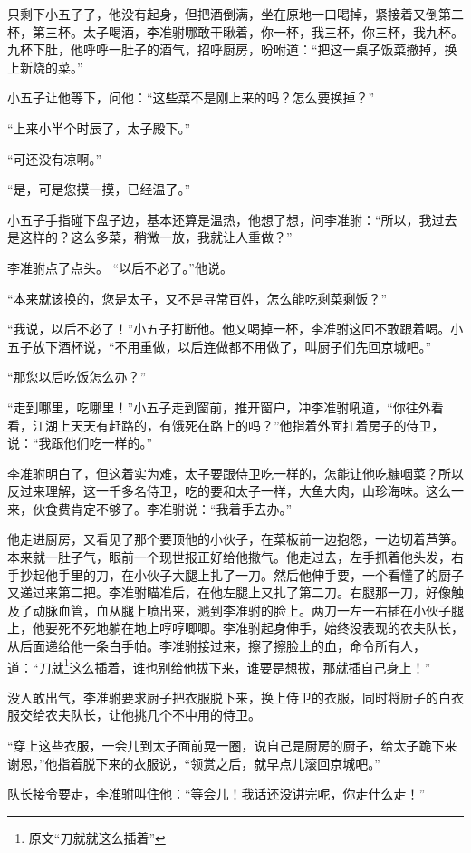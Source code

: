 只剩下小五子了，他没有起身，但把酒倒满，坐在原地一口喝掉，紧接着又倒第二杯，第三杯。太子喝酒，李准驸哪敢干瞅着，你一杯，我三杯，你三杯，我九杯。九杯下肚，他呼呼一肚子的酒气，招呼厨房，吩咐道：“把这一桌子饭菜撤掉，换上新烧的菜。”

小五子让他等下，问他：“这些菜不是刚上来的吗？怎么要换掉？”

“上来小半个时辰了，太子殿下。”

“可还没有凉啊。”

“是，可是您摸一摸，已经温了。”

小五子手指碰下盘子边，基本还算是温热，他想了想，问李准驸：“所以，我过去是这样的？这么多菜，稍微一放，我就让人重做？”

李准驸点了点头。 “以后不必了。”他说。

“本来就该换的，您是太子，又不是寻常百姓，怎么能吃剩菜剩饭？”

“我说，以后不必了！”小五子打断他。他又喝掉一杯，李准驸这回不敢跟着喝。小五子放下酒杯说，“不用重做，以后连做都不用做了，叫厨子们先回京城吧。”

“那您以后吃饭怎么办？”

“走到哪里，吃哪里！”小五子走到窗前，推开窗户，冲李准驸吼道，“你往外看看，江湖上天天有赶路的，有饿死在路上的吗？”他指着外面扛着房子的侍卫，说：“我跟他们吃一样的。”

李准驸明白了，但这着实为难，太子要跟侍卫吃一样的，怎能让他吃糠咽菜？所以反过来理解，这一千多名侍卫，吃的要和太子一样，大鱼大肉，山珍海味。这么一来，伙食费肯定不够了。李准驸说：“我着手去办。”

他走进厨房，又看见了那个要顶他的小伙子，在菜板前一边抱怨，一边切着芦笋。本来就一肚子气，眼前一个现世报正好给他撒气。他走过去，左手抓着他头发，右手抄起他手里的刀，在小伙子大腿上扎了一刀。然后他伸手要，一个看懂了的厨子又递过来第二把。李准驸瞄准后，在他左腿上又扎了第二刀。右腿那一刀，好像触及了动脉血管，血从腿上喷出来，溅到李准驸的脸上。两刀一左一右插在小伙子腿上，他要死不死地躺在地上哼哼唧唧。李准驸起身伸手，始终没表现的农夫队长，从后面递给他一条白手帕。李准驸接过来，擦了擦脸上的血，命令所有人，道：“刀就\footnote{原文“刀就就这么插着”}这么插着，谁也别给他拔下来，谁要是想拔，那就插自己身上！”

没人敢出气，李准驸要求厨子把衣服脱下来，换上侍卫的衣服，同时将厨子的白衣服交给农夫队长，让他挑几个不中用的侍卫。

“穿上这些衣服，一会儿到太子面前晃一圈，说自己是厨房的厨子，给太子跪下来谢恩，”他指着脱下来的衣服说，“领赏之后，就早点儿滚回京城吧。”

队长接令要走，李准驸叫住他：“等会儿！我话还没讲完呢，你走什么走！”


